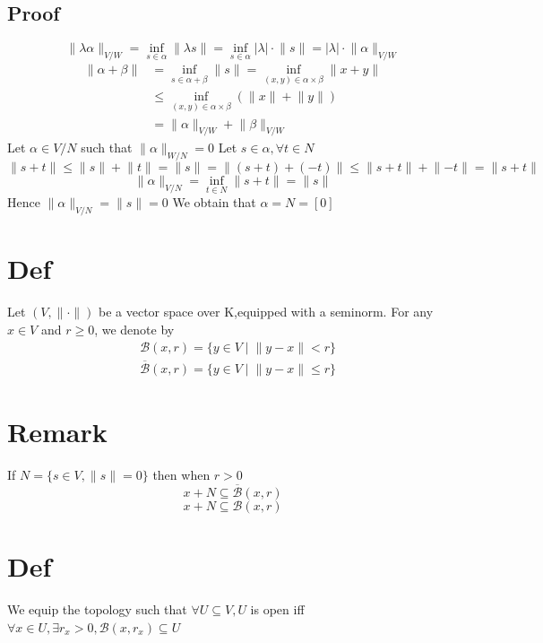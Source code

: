 \documentclass{book}
\begin{document}
\subsection*{Proof}
$$\lVert \lambda \alpha\rVert _{V/W}=\inf\limits_{s\in \alpha}\lVert \lambda s\rVert=\inf\limits_{s\in \alpha}\lvert\lambda\rvert\cdot\lVert s\rVert=\lvert\lambda\rvert\cdot\lVert \alpha\rVert _{V/W}$$
$$\begin{aligned}
    \lVert\alpha+\beta\rVert&=\inf\limits_{s\in \alpha+\beta}\lVert s\rVert=\inf\limits_{(x,y)\in \alpha\times\beta}\lVert x+y\rVert\\
     &\leq\inf\limits_{(x,y)\in \alpha\times\beta}(\lVert x\rVert+\lVert y\rVert)\\
     & =\lVert \alpha\rVert _{V/W}+\lVert \beta\rVert _{V/W}
\end{aligned}$$
Let $\alpha\in V/N$ such that $\lVert\alpha\rVert _{W/N}=0$ Let $s\in \alpha,\forall t\in N$$$\lVert s+t\rVert\leq \lVert s\rVert+\lVert t\rVert=\lVert s\rVert =\lVert (s+t)+(-t)\rVert\leq\lVert s+t\rVert+\lVert-t\rVert=\lVert s+t\rVert$$$$\lVert\alpha\rVert _{V/N}=\inf\limits_{t\in N}\lVert s+t\rVert=\lVert s\rVert$$
Hence $\lVert\alpha\rVert _{V/N}=\lVert s\rVert=0$ We obtain that $\alpha=N=[0]$
\section{Def}
Let $(V,\lVert\cdot\rVert)$ be a vector space over K,equipped with a seminorm. For any $x\in V$ and $r\geq0$, we denote by$$\begin{aligned}
    &\mathcal{B}(x,r)=\{y\in V\mid\lVert y-x\rVert<r\}\\
    &\overline{\mathcal{B}}(x,r)=\{y\in V\mid\lVert y-x\rVert\leq r\}
\end{aligned}$$
\section{Remark}If $N=\{s\in V,\lVert s\rVert=0\}$ then when $r>0$
$$x+N\subseteq\overline{\mathcal{B}}(x,r)$$$$x+N\subseteq \mathcal{B}(x,r)$$
\section{Def}
We equip the topology such that $\forall U\subseteq V, U$ is open iff $\forall x\in U,\exists r_x>0, \mathcal{B}(x,r_x)\subseteq U$
\end{document}
